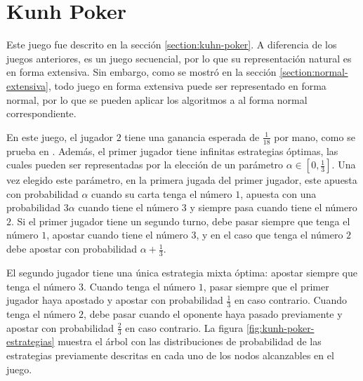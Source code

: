 \section{Kunh Poker}

Este juego fue descrito en la sección \ref{section:kuhn-poker}. A diferencia de los juegos anteriores, es un juego secuencial, por lo que su representación natural es en forma extensiva. Sin embargo, como se mostró en la sección \ref{section:normal-extensiva}, todo juego en forma extensiva puede ser representado en forma normal, por lo que se pueden aplicar los algoritmos a al forma normal correspondiente.

En este juego, el jugador $2$ tiene una ganancia esperada de $\frac{1}{18}$ por mano, como se prueba en \cite{bib:kuhn-poker}. Además, el primer jugador tiene infinitas estrategias óptimas, las cuales pueden ser representadas por la elección de un parámetro $\alpha \in [ 0, \frac{1}{3} ]$. Una vez elegido este parámetro, en la primera jugada del primer jugador, este apuesta con probabilidad $\alpha$ cuando su carta tenga el número $1$, apuesta con una probabilidad $3 \alpha$ cuando tiene el número $3$ y siempre pasa cuando tiene el número $2$. Si el primer jugador tiene un segundo turno, debe pasar siempre que tenga el número $1$, apostar cuando tiene el número $3$, y en el caso que tenga el número $2$ debe apostar con probabilidad $\alpha + \frac{1}{3}$.

El segundo jugador tiene una única estrategia mixta óptima: apostar siempre que tenga el número $3$. Cuando tenga el número $1$, pasar siempre que el primer jugador haya apostado y apostar con probabilidad $\frac{1}{3}$ en caso contrario. Cuando tenga el número $2$, debe pasar cuando el oponente haya pasado previamente y apostar con probabilidad $\frac{2}{3}$ en caso contrario. La figura \ref{fig:kunh-poker-estrategias} muestra el árbol con las distribuciones de probabilidad de las estrategias previamente descritas en cada uno de los nodos alcanzables en el juego.

